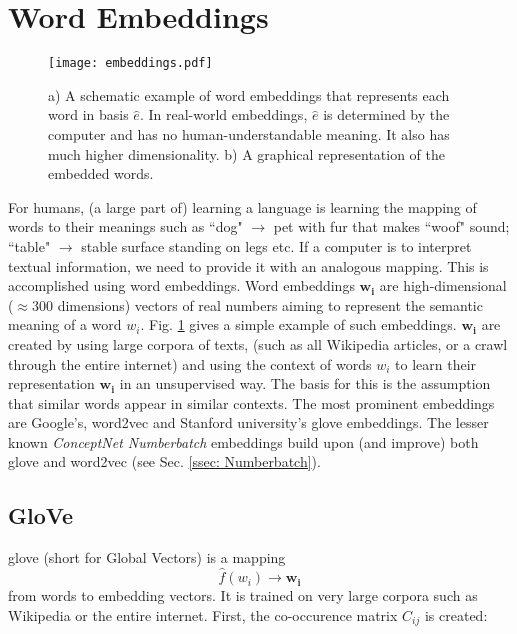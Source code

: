 \section{Word Embeddings \label{ssec: word embeddings}}

    \begin{figure}
        \centering
        \texttt{[image: embeddings.pdf]}
        \caption{a) A schematic example of word \glspl{embedding} that represents each word in basis $\hat{e}$. In real-world embeddings, $\hat{e}$ is determined by the computer and has no human-understandable meaning. It also has much higher dimensionality. b) A graphical representation of the embedded words.}
        \label{fig:word embedding}
    \end{figure}

    For humans, (a large part of) learning a language is learning the mapping of words to their meanings such as ``dog" $\rightarrow$ pet with fur that makes ``woof" sound; ``table" $\rightarrow$ stable surface standing on legs etc. If a computer is to interpret textual information, we need to provide it with an analogous mapping. This is accomplished using word embeddings.
    Word \glspl{embedding} $\mathbf{w_i}$ are high-dimensional ($\approx 300$ dimensions) vectors of real numbers aiming to represent the semantic meaning of a word $w_i$. Fig. \ref{fig:word embedding} gives a simple example of such \glspl{embedding}. $\mathbf{w_i}$ are created by using large corpora of texts, (such as all Wikipedia articles, or a crawl through the entire internet) and using the context of words $w_i$ to learn their representation $\mathbf{w_i}$ in an unsupervised way. The basis for this is the assumption that similar words appear in similar contexts\cite{word2vec}.
    The most prominent \glspl{embedding} are Google's, word2vec\cite{word2vec} and Stanford university's \gls{glove}\cite{glove} \glspl{embedding}. The lesser known \textit{ConceptNet Numberbatch} \glspl{embedding}\cite{conceptnet} build upon (and improve) both \gls{glove} and word2vec (see Sec. \ref{ssec: Numberbatch}).

    \subsection{GloVe \label{ssec: Glove}}
        \gls{glove}\cite{glove} (short for Global Vectors) is a mapping
        \[ \hat{f}(w_i) \rightarrow \mathbf{w_i}\]
        from words to \gls{embedding} vectors. It is trained on very large corpora such as Wikipedia or the entire internet. First, the co-occurence matrix $C_{ij}$ is created:

